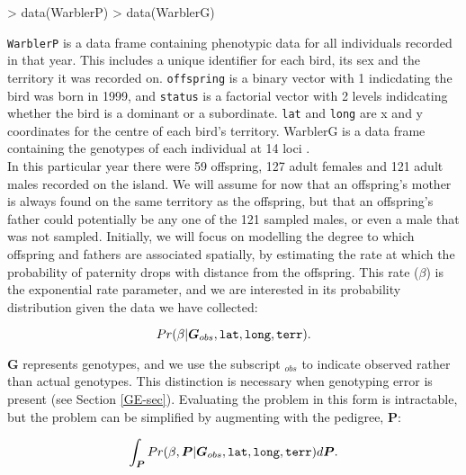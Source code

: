 \documentclass{article}
\begin{document}
\begin{Schunk}
\begin{Sinput}
> data(WarblerP)
> data(WarblerG)
\end{Sinput}
\end{Schunk}

 \texttt{WarblerP} is a data frame containing phenotypic data for all individuals recorded in that year.  This includes a unique identifier for each bird, its sex and the territory it was recorded on. \texttt{offspring} is a binary vector with 1 indicdating the bird was born in 1999, and \texttt{status} is a factorial vector with 2 levels indidcating whether the bird is a dominant or a subordinate. \texttt{lat} and \texttt{long} are x and y coordinates for the centre of each bird's territory. {WarblerG} is a data frame containing the genotypes of each individual at 14 loci \citep{Richardson.2000}.\\

In this particular year there were 59 offspring, 127 adult females and 121 adult males recorded on the island.  We will assume for now that an offspring's mother is always found on the same territory as the offspring, but that an offspring's father could potentially be any one of the 121 sampled males, or even a male that was not sampled.  Initially, we will focus on modelling the degree to which offspring and fathers are associated spatially, by estimating the rate at which the probability of paternity drops with distance from the offspring.  This rate ($\beta$) is the exponential rate parameter, and we are interested in its probability distribution given the data we have collected:


\begin{equation}
Pr(\beta | \bm{G}_{obs}, \textrm{\texttt{lat}}, \textrm{\texttt{long}}, \textrm{\texttt{terr}}).
\label{no_pedigree-eq}
\end{equation}

$\bm{G}$ represents genotypes, and we use the subscript $_{obs}$ to indicate observed rather than actual genotypes. This distinction is necessary when genotyping error is present (see Section \ref{GE-sec}).  Evaluating the problem in this form is intractable, but the problem can be simplified by augmenting with the pedigree, $\bm{P}$:

\begin{equation}
\int_{\bm P}Pr(\beta,  {\bm P}| \bm{G}_{obs}, \textrm{\texttt{lat}}, \textrm{\texttt{long}}, \textrm{\texttt{terr}})d{\bm P}.
\label{pedigree-eq}
\end{equation}
\end{document}
